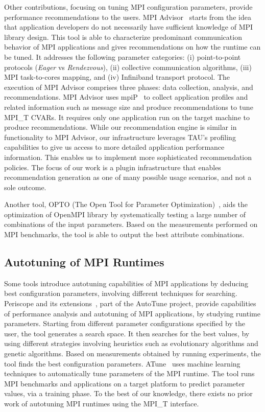 Other contributions, focusing on tuning MPI configuration parameters, provide performance recommendations to the users.
MPI Advisor~\cite{Gallardo:2015:MAM:2802658.2802667,doi:10.1177/1094342016684005} starts from the idea that application developers do not necessarily have sufficient knowledge of MPI library design. 
This tool is able to characterize predominant communication behavior of MPI applications and gives recommendations on how the runtime can be tuned. 
It addresses the following parameter categories: (i) point-to-point protocols (\textit{Eager} vs \textit{Rendezvous}), (ii) collective communication algorithms, (iii) MPI task-to-cores mapping, and (iv) Infiniband transport protocol.
The execution of MPI Advisor comprises three phases: data collection, analysis, and recommendations.
MPI Advisor uses mpiP~\cite{mpiP} to collect application profiles and related information such as message size and produce recommendations to tune MPI\_T CVARs.
It requires only one application run on the target machine to produce recommendations.
While our recommendation engine is similar in functionality to MPI Advisor, our infrastructure leverages TAU's profiling capabilities to give us access to more detailed application performance information. This enables us to implement more sophisticated recommendation policies. The focus of our work is a plugin infrastructure that enables recommendation generation as one of many possible usage scenarios, and not a sole outcome.
\par Another tool, OPTO (The Open Tool for Parameter Optimization)~\cite{Chaarawi2008}, aids the optimization of OpenMPI library by systematically testing a large number of combinations of the input parameters.
Based on the measurements performed on MPI benchmarks, the tool is able to output the best attribute combinations.

\subsection{Autotuning of MPI Runtimes}

Some tools introduce autotuning capabilities of MPI applications by deducing best configuration parameters, involving different techniques for searching.
Periscope and its extensions~\cite{Gerndt:2010:APA:1753228.1753232,Sikora:2016:AMA:2916026.2916028}, part of the AutoTune project, provide capabilities of performance analysis and autotuning of MPI applications, by studying runtime parameters. 
Starting from different parameter configurations specified by the user, the tool generates a search space. 
It then searches for the best values, by using different strategies involving heuristics such as evolutionary algorithms and genetic algorithms. 
Based on measurements obtained by running experiments, the tool finds the best configuration parameters.
ATune~\cite{Pellegrini:2010:ATM:1787275.1787310} uses machine learning techniques to automatically tune parameters of the MPI runtime.
The tool runs MPI benchmarks and applications on a target platform to predict parameter values, via a training phase.
To the best of our knowledge, there exists no prior work of autotuning MPI runtimes using the MPI\_T interface.

